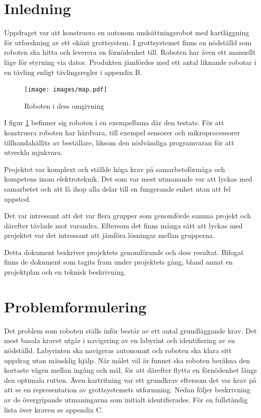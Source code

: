\documentclass[11pt]{article}
\begin{document}
\begin{flushleft}
\section{Inledning}
Uppdraget var att konstruera en autonom undsättningsrobot med kartläggning för utforskning av ett okänt grottsystem. I grottsystemet finns en nödställd som roboten ska hitta och leverera en förnödenhet till. Roboten har även ett manuellt läge för styrning via dator. Produkten jämfördes med ett antal liknande robotar i en tävling enligt tävlingsregler i appendix B.

\begin{figure}[!htbp]
\centering
\texttt{[image: images/map.pdf]}
	\caption{Roboten i dess omgivning\label{scene}}	
\end{figure}

I figur \ref{scene} befinner sig roboten i en exempelbana där den testats. För att konstruera roboten har hårdvara, till exempel sensorer och mikroprocessorer tillhandahållits av beställare, liksom den nödvändiga programvaran för att utveckla mjukvara.

Projektet var komplext och ställde höga krav på samarbetsförmåga och kompetens inom elektroteknik. Det som var mest utmanande var att lyckas med samarbetet och att få ihop alla delar till en fungerande enhet utan att fel uppstod. 

Det var intressant att det var flera grupper som genomförde samma projekt och därefter tävlade mot varandra. Eftersom det finns många sätt att lyckas med projektet var det intressant att jämföra lösningar mellan grupperna.

Detta dokument beskriver projektets genomförande och dess resultat. Bifogat finns de dokument som tagits fram under projektets gång, bland annat en projektplan och en teknisk beskrivning.

\pagebreak

\section{Problemformulering}
Det problem som roboten ställs inför består av ett antal grundläggande krav. Det mest basala kravet utgår i navigering av en labyrint och identifiering av en nödställd. Labyrinten ska navigeras autonomnt och roboten ska klara sitt uppdrag utan mänsklig hjälp. När målet väl är funnet ska roboten beräkna den kortaste vägen mellan ingång och mål, för att därefter flytta en förnödenhet längs den optimala rutten.  Även kartritning var ett grundkrav eftersom det var krav på att se en representation av grottsystemets utformning. Nedan följer beskrivning av de övergripande utmaningarna som initialt identifierades. För en fullständig lista över kraven se appendix C.


\end{flushleft}
\end{document}

